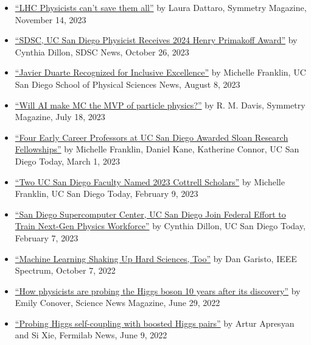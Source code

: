 \documentclass[11pt]{res}
\begin{document}
\begin{resume}
\begin{itemize}
    \item \href{https://www.symmetrymagazine.org/article/lhc-physicists-cant-save-them-all}{``LHC Physicists can't save them all''} by Laura Dattaro, Symmetry Magazine, November 14, 2023
    \item \href{https://www.sdsc.edu/News%20Items/PR20231026_physics_award.html}{``SDSC, UC San Diego Physicist Receives 2024 Henry Primakoff Award''} by Cynthia Dillon, SDSC News, October 26, 2023
    \item \href{https://physicalsciences.ucsd.edu/media-events/articles/2023/duarte-edi.html}{``Javier Duarte Recognized for Inclusive Excellence''} by Michelle Franklin, UC San Diego School of Physical Sciences News, August 8, 2023
    \item \href{https://www.symmetrymagazine.org/article/will-ai-make-mc-the-mvp-of-particle-physics}{``Will AI make MC the MVP of particle physics?''} by R. M. Davis, Symmetry Magazine, July 18, 2023
    \item \href{https://today.ucsd.edu/story/four-early-career-professors-at-uc-san-diego-awarded-sloan-research-fellowships}{``Four Early Career Professors at UC San Diego Awarded Sloan Research Fellowships''} by Michelle Franklin, Daniel Kane, Katherine Connor, UC San Diego Today, March 1, 2023
    \item \href{https://today.ucsd.edu/story/2023-cottrell-scholars}{``Two UC San Diego Faculty Named 2023 Cottrell Scholars''} by Michelle Franklin, UC San Diego Today, February 9, 2023
    \item \href{https://today.ucsd.edu/story/san-diego-supercomputer-center-uc-san-diego-join-federal-effort-to-train-next-gen-physics-workforce}{``San Diego Supercomputer Center, UC San Diego Join Federal Effort to Train Next-Gen Physics Workforce''} by Cynthia Dillon, UC San Diego Today, February 7, 2023
    \item \href{https://spectrum.ieee.org/machine-learning-in-physics}{``Machine Learning Shaking Up Hard Sciences, Too''} by Dan Garisto, IEEE Spectrum, October 7, 2022
    \item \href{https://www.sciencenews.org/article/higgs-boson-particle-physics-standard-model-discovery-anniversary}{``How physicists are probing the Higgs boson 10 years after its discovery''} by Emily Conover, Science News Magazine, June 29, 2022
    \item \href{https://news.fnal.gov/2022/06/probing-higgs-self-coupling-with-boosted-higgs-pairs/}{``Probing Higgs self-coupling with boosted Higgs pairs''} by Artur Apresyan and Si Xie, Fermilab News, June 9, 2022

\end{itemize}
\end{resume}
\end{document}
